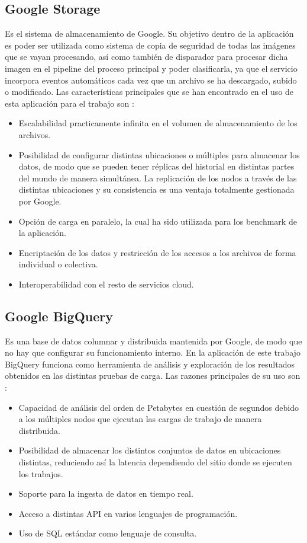 \subsection{Google Storage}\label{subsec:storage}
Es el sistema de almacenamiento de Google.
Su objetivo dentro de la aplicación es poder ser utilizada como sistema de copia de seguridad de todas las imágenes que se vayan procesando, así como también de disparador para procesar dicha
imagen en el pipeline del proceso principal y poder clasificarla, ya que el servicio incorpora eventos automáticos cada vez que un archivo se ha descargado, subido o modificado.
Las características principales que se han encontrado en el uso de esta aplicación para el trabajo son :
\begin{itemize}
    \item Escalabilidad practicamente infinita en el volumen de almacenamiento de los archivos.
    \item Posibilidad de configurar distintas ubicaciones o múltiples para almacenar los datos, de modo que se pueden tener réplicas del historial en distintas partes del mundo de manera simultánea.
    La replicación de los nodos a través de las distintas ubicaciones y su consistencia es una ventaja totalmente gestionada por Google.
    \item Opción de carga en paralelo, la cual ha sido utilizada para los benchmark de la aplicación.
    \item Encriptación de los datos y restricción de los accesos a los archivos de forma individual o colectiva.
    \item Interoperabilidad con el resto de servicios cloud.
\end{itemize}

\subsection{Google BigQuery}\label{subsec:bigquery}
Es una base de datos columnar y distribuida mantenida por Google, de modo que no hay que configurar su funcionamiento interno.
En la aplicación de este trabajo BigQuery funciona como herramienta de análisis y exploración de los resultados obtenidos en las distintas pruebas de carga.
Las razones principales de su uso son :
\begin{itemize}
    \item Capacidad de análisis del orden de Petabytes en cuestión de segundos debido a los múltiples nodos que ejecutan las cargas de trabajo de manera distribuida.
    \item Posibilidad de almacenar los distintos conjuntos de datos en ubicaciones distintas, reduciendo así la latencia dependiendo del sitio donde se ejecuten los trabajos.
    \item Soporte para la ingesta de datos en tiempo real.
    \item Acceso a distintas API en varios lenguajes de programación.
    \item Uso de SQL estándar como lenguaje de consulta.
\end{itemize}

